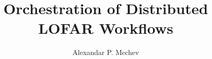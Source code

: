 \documentclass[8pt,b5paper,twoside,openright]{book}
\begin{document}
\title{\LARGE {\bf Orchestration of Distributed LOFAR Workflows}\\
 \vspace*{6mm}
}

\author{Alexandar P. Mechev}

\normallinespacing
\maketitle
\onehalfspacing

\preface








\body


%













\stopthumb


\clearpage
\printglossaries

\clearpage
{}
%	

\printbibliography
\end{document}
